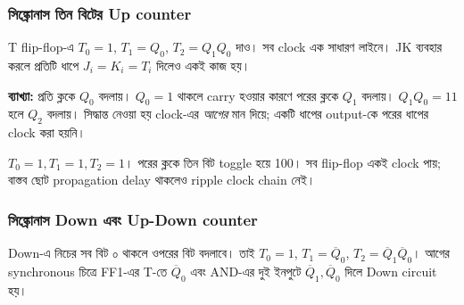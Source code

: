 \subsubsection*{সিঙ্ক্রোনাস তিন বিটের Up counter}
T flip-flop-এ $T_0=1$, $T_1=Q_0$, $T_2=Q_1Q_0$ দাও। সব clock এক সাধারণ লাইনে। JK ব্যবহার করলে প্রতিটি ধাপে $J_i=K_i=T_i$ দিলেও একই কাজ হয়।
\begin{center}
\begin{minipage}{\linewidth}\centering\begin{chThreeDiagram}\end{chThreeDiagram}

\end{minipage}
\end{center}
\textbf{ব্যাখ্যা:} প্রতি ক্লকে $Q_0$ বদলায়। $Q_0=1$ থাকলে carry হওয়ার কারণে পরের ক্লকে $Q_1$ বদলায়। $Q_1Q_0=11$ হলে $Q_2$ বদলায়। সিদ্ধান্ত নেওয়া হয় clock-এর \emph{আগের} মান দিয়ে; একটি ধাপের output-কে পরের ধাপের clock করা হয়নি।

\chThreeAnswer $T_0=1,T_1=1,T_2=1$। পরের ক্লকে তিন বিট toggle হয়ে 100। সব flip-flop একই clock পায়; বাস্তব ছোট propagation delay থাকলেও ripple clock chain নেই।

\subsubsection*{সিঙ্ক্রোনাস Down এবং Up-Down counter}
Down-এ নিচের সব বিট ০ থাকলে ওপরের বিট বদলাবে। তাই $T_0=1$, $T_1=\overline Q_0$, $T_2=\overline Q_1\overline Q_0$। আগের synchronous চিত্রে FF1-এর T-তে $\overline Q_0$ এবং AND-এর দুই ইনপুটে $\overline Q_1,\overline Q_0$ দিলে Down circuit হয়।

